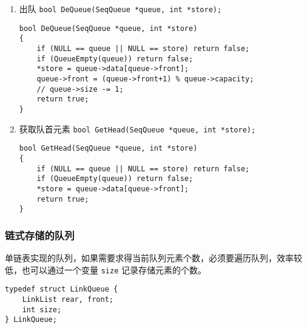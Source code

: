 \documentclass{ctexart}
\begin{document}
\begin{enumerate}
\item 出队 \texttt{bool DeQueue(SeqQueue *queue, int *store);}
\begin{verbatim}
bool DeQueue(SeqQueue *queue, int *store)
{
    if (NULL == queue || NULL == store) return false;
    if (QueueEmpty(queue)) return false;
    *store = queue->data[queue->front];
    queue->front = (queue->front+1) % queue->capacity;
    // queue->size -= 1;
    return true;
}
\end{verbatim}

\item 获取队首元素 \texttt{bool GetHead(SeqQueue *queue, int *store);}
\begin{verbatim}
bool GetHead(SeqQueue *queue, int *store)
{
    if (NULL == queue || NULL == store) return false;
    if (QueueEmpty(queue)) return false;
    *store = queue->data[queue->front];
    return true;
}
\end{verbatim}
\end{enumerate}

\subsubsection{链式存储的队列}
单链表实现的队列，如果需要求得当前队列元素个数，必须要遍历队列，效率较低，也可以通过一个变量 \texttt{size} 记录存储元素的个数。
\begin{verbatim}
typedef struct LinkQueue {
    LinkList rear, front;
    int size;
} LinkQueue;
\end{verbatim}
\end{document}
